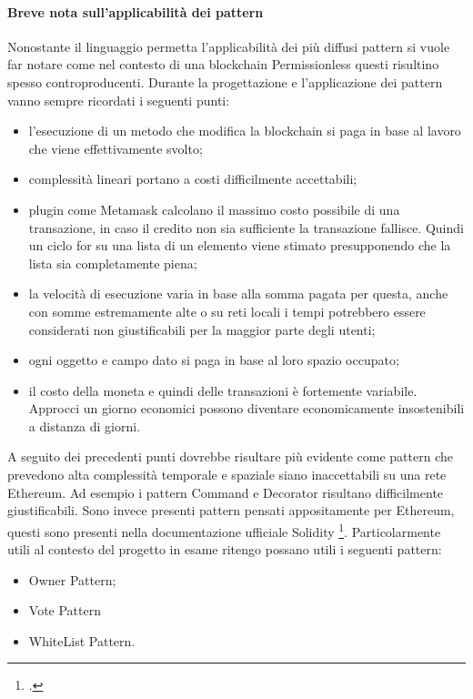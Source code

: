 \paragraph{Breve nota sull'applicabilità dei pattern}
Nonostante il linguaggio permetta l’applicabilità dei più diffusi pattern si vuole far notare come nel contesto di una blockchain Permissionless questi risultino spesso controproducenti. 
Durante la progettazione e l’applicazione dei pattern vanno sempre ricordati i seguenti punti:
\begin{itemize}
    \item l’esecuzione di un metodo che modifica la blockchain si paga in base al lavoro che viene effettivamente svolto;
    \item complessità lineari portano a costi difficilmente accettabili;
    \item plugin come Metamask calcolano il massimo costo possibile di una transazione, in caso il credito non sia sufficiente la transazione fallisce. Quindi un ciclo for su una lista di un elemento viene stimato presupponendo che la lista sia completamente piena;
    \item la velocità di esecuzione varia in base alla somma pagata per questa, anche con somme estremamente alte o su reti locali i tempi potrebbero essere considerati non giustificabili per la maggior parte degli utenti;
    \item ogni oggetto e campo dato si paga in base al loro spazio occupato;
    \item il costo della moneta e quindi delle transazioni è fortemente variabile. Approcci un giorno economici possono diventare economicamente insostenibili a distanza di giorni.
\end{itemize}
A seguito dei precedenti punti dovrebbe risultare più evidente come pattern che prevedono alta complessità temporale e spaziale siano inaccettabili su una rete Ethereum. Ad esempio i pattern Command e Decorator risultano difficilmente giustificabili.
Sono invece presenti pattern pensati appositamente per Ethereum, questi sono presenti nella documentazione ufficiale Solidity \footcite{site:solidity-documentation}. Particolarmente utili al contesto del progetto in esame ritengo possano utili i seguenti pattern: 
\begin{itemize}
    \item Owner Pattern;
    \item Vote Pattern 
    \item WhiteList Pattern.
\end{itemize}

